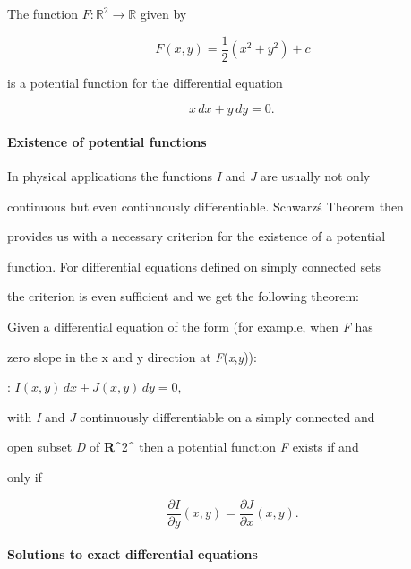 The function $F:\mathbb{R}^{2}\to\mathbb{R}$ given by



$$F(x,y) = \frac{1}{2}(x^2 + y^2)+c$$



is a potential function for the differential equation



$$x\,dx + y\,dy = 0.\,$$



\paragraph{Existence of potential functions}



In physical applications the functions \textit{I} and \textit{J} are usually not only

continuous but even continuously differentiable. Schwarz\'s Theorem then

provides us with a necessary criterion for the existence of a potential

function. For differential equations defined on simply connected sets

the criterion is even sufficient and we get the following theorem:



Given a differential equation of the form (for example, when \textit{F} has

zero slope in the x and y direction at \textit{F}(\textit{x},\textit{y})):



:   $I(x, y)\, dx + J(x, y)\, dy = 0,$



with \textit{I} and \textit{J} continuously differentiable on a simply connected and

open subset \textit{D} of \textbf{R}^2^ then a potential function \textit{F} exists if and

only if



$$\frac{\partial I}{\partial y}(x, y) = \frac{\partial J}{\partial x}(x, y).$$



\paragraph{Solutions to exact differential equations}




